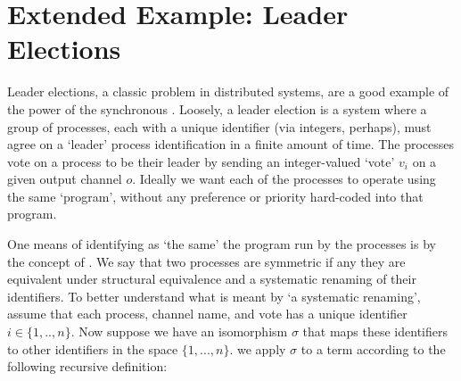 \section{Extended Example: Leader Elections}\label{secleaderelecs}
Leader elections, a classic problem in distributed systems, are a good example of the power of the synchronous \picalc.
Loosely, a leader election is a system where a group of processes, each with a unique identifier (via integers, perhaps), must agree on a `leader' process identification in a finite amount of time.
The processes vote on a process to be their leader by sending an integer-valued `vote' $v_i$ on a given output channel $o$.  
Ideally we want each of the processes to operate using the same `program', without any preference or priority hard-coded into that program.

One means of identifying as `the same' the program run by the processes is by the concept of .
We say that two processes are symmetric if any they are equivalent under structural equivalence and a systematic renaming of their identifiers.
To better understand what is meant by `a systematic renaming', assume that each process, channel name, and vote has a unique identifier $i \in \{1,..,n\}$.
Now suppose we have an isomorphism $\sigma$ that maps these identifiers to other identifiers in the space $\{1,...,n\}$.
we apply $\sigma$ to a term according to the following recursive definition:
